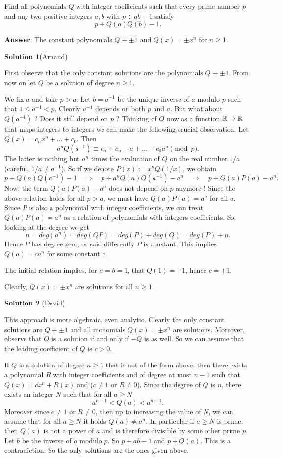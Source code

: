 Find all polynomials $Q$ with integer coefficients such that every prime number $p$ and any two positive integers $a,b$ with $p\div ab-1$ satisfy
\[
p\div Q(a)Q(b)-1.
\]

\textbf{Answer}: The constant polynomials $Q\equiv \pm 1$ and $Q(x)=\pm x^n$ for $n\geq 1$.

\textbf{Solution 1}(Arnaud)

First observe that the only constant solutions are the polynomials $Q\equiv \pm 1$. From now on let $Q$ be a solution of degree $n\geq 1$. 

We fix $a$ and take $p>a$. Let $b=a^{-1}$ be the unique inverse of $a$ modulo $p$ such that $1\leq a^{-1}<p$. Clearly $a^{-1}$ depends on both $p$ and $a$. But what about $Q(a^{-1})$ ? Does it still depend on $p$ ? Thinking of $Q$ now as a function $\mathbb{R}\to \mathbb{R}$ that maps integers to integers we can make the following crucial observation. Let $Q(x)=c_nx^n+\ldots+c_0$. Then
\[
a^nQ(a^{-1})\equiv c_n+c_{n-1}a+\ldots+c_0a^n\pmod{p}.
\]
The latter is nothing but $a^n$ times the evaluation of $Q$ on the real number $1/a$ (careful, $1/a\neq a^{-1}$). So if we denote $P(x):=x^nQ(1/x)$, we obtain
\[
p\div Q(a)Q(a^{-1})-1\quad\Rightarrow\quad p\div a^nQ(a)Q(a^{-1})-a^n\quad\Rightarrow\quad p\div Q(a)P(a)-a^n.
\]
Now, the term $Q(a)P(a)-a^n$ does not depend on $p$ anymore ! Since the above relation holds for all $p>a$, we must have $Q(a)P(a)=a^n$ for all $a$. Since $P$ is also a polynomial with integer coefficients, we can treat $Q(a)P(a)=a^n$ as a relation of polynomials with integers coefficients. So, looking at the degree we get
\[
n=deg(a^n)=deg(QP)=deg(P)+deg(Q)=deg(P)+n.
\]
Hence $P$ has degree zero, or said differently $P$ is constant. This implies $Q(a)=ca^n$ for some constant $c$.

The initial relation implies, for $a=b=1$, that $Q(1)=\pm 1$, hence $c=\pm 1$. 

Clearly, $Q(x)=\pm x^n$ are solutions for all $n\geq 1$.

\textbf{Solution 2} (David)

This approach is more algebraic, even analytic. Clearly the only constant solutions are $Q\equiv \pm 1$ and all monomials $Q(x)=\pm x^n$ are solutions. Moreover, observe that $Q$ is a solution if and only if $-Q$ is as well. So we can assume that the leading coefficient of $Q$ is $c>0$.

If $Q$ is a solution of degree $n\geq 1$ that is not of the form above, then there exists a polynomial $R$ with integer coefficients and of degree at most $n-1$ such that $Q(x)=cx^n+R(x)$ and ($c\neq 1$ or $R\neq 0$). Since the degree of $Q$ is $n$, there exists an integer $N$ such that for all $a\geq N$
\[
a^{n-1}<Q(a)<a^{n+1}.
\]
Moreover since $c\neq 1$ or $R\neq 0$, then up to increasing the value of $N$, we can assume that for all $a\geq N$ it holds $Q(a)\neq a^{n}$. In particular if $a\geq N$ is prime, then $Q(a)$ is not a power of $a$ and is therefore divisible by some other prime $p$. Let $b$ be the inverse of $a$ modulo $p$. So $p\div ab-1$ and $p\div Q(a)$. This is a contradiction. So the only solutions are the ones given above.

